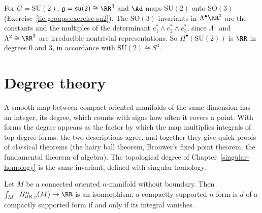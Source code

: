 \begin{example}\label{de-rham:example-su2}
For $G = \mathrm{SU}(2)$, $\mathfrak{g} = \mathfrak{su}(2) \cong \RR^3$ and $\Ad$ maps $\mathrm{SU}(2)$ onto $\mathrm{SO}(3)$ (Exercise~\ref{lie-groups:exercise-su2}). The $\mathrm{SO}(3)$-invariants in $\Lambda^\bullet\RR^3$ are the constants and the
multiples of the determinant $e_1^* \wedge e_2^* \wedge e_3^*$, since $\Lambda^1$ and $\Lambda^2 \cong \RR^3$ are irreducible nontrivial representations. So $H^\bullet(\mathrm{SU}(2))$ is $\RR$ in degrees $0$ and $3$, in accordance with
$\mathrm{SU}(2) \cong S^3$.
\end{example}

\section{Degree theory}\label{de-rham:section-degree}

A smooth map between compact oriented manifolds of the same dimension has an integer, its degree, which counts with signs how often it covers a point. With forms the degree appears as the factor by which the map
multiplies integrals of top-degree forms; the two descriptions agree, and together they give quick proofs of classical theorems (the hairy ball theorem, Brouwer's fixed point theorem, the fundamental theorem of
algebra). The topological degree of Chapter~\ref{singular-homology} is the same invariant, defined with singular homology.

\begin{lemma}\label{de-rham:lemma-top-compact}
Let $M$ be a connected oriented $n$-manifold without boundary. Then $\int_M \colon H^n_{\mathrm{dR},c}(M) \to \RR$ is an isomorphism: a compactly supported $n$-form is $d$ of a compactly supported form if and only if its integral vanishes.
\end{lemma}

